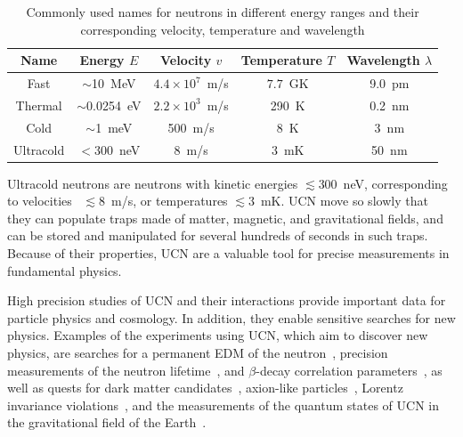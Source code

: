 \begin{table}
  \centering
  \begin{tabular}{|c|c|c|c|c|}
    \hline
    Name & Energy $E$ & Velocity $v$ & Temperature $T$ & Wavelength $\lambda$ \\
    \hline
    \hline
    Fast & $\sim$10~MeV & $4.4 \times 10^7$~m/s & $7.7$~GK & 9.0~pm \\
    \hline
    Thermal & $\sim$0.0254~eV & $ 2.2 \times 10^3$~m/s & 290~K & 0.2~nm \\
    \hline
    Cold & $\sim$1~meV & 500~m/s & 8~K & 3~nm \\
    \hline
    Ultracold & $<$300~neV & 8~m/s & 3~mK & 50~nm \\
    \hline
  \end{tabular}
  \caption[Neutron names in different energy ranges and their
  corresponding velocities, temperatures, and wavelength]{Commonly
    used names for neutrons in different energy ranges and their
    corresponding velocity, temperature and
    wavelength \label{tab:ucnenergy}}
\end{table}


Ultracold neutrons are neutrons with kinetic energies $\lesssim 300$~neV,
corresponding to velocities ~$\lesssim 8$~m/s, or temperatures
$\lesssim 3$~mK. UCN move so slowly that they can populate traps made
of matter, magnetic, and gravitational fields, and can be stored and
manipulated for several hundreds of seconds in such traps. Because of
their properties, UCN are a valuable tool for precise measurements in
fundamental physics.

High precision studies of UCN and their interactions provide important
data for particle physics and cosmology. In addition, they enable
sensitive searches for new physics. Examples of the experiments using
UCN, which aim to discover new physics, are searches for a permanent
EDM of the
neutron~\cite{Baker2006,Serebrov2009,Lam_Gol,Altarev2010,Pendlebury2015},
precision measurements of the neutron
lifetime~\cite{pattie2018measurement,Paul2009,Wietfeldt2011,Arzumanov2000,Serebrov2005,Huffman},
and $\beta$-decay correlation
parameters~\cite{plaster2012measurement,Mendenhall,Broussard}, as well
as quests for dark matter candidates~\cite{Serebrov2008,Zimmer2010},
axion-like particles~\cite{Baessler,Serebrov2010,Afach2015}, Lorentz
invariance violations~\cite{Altarev2009}, and the measurements of the
quantum states of UCN in the gravitational field of the
Earth~\cite{Nesvizhevsky2003}.

